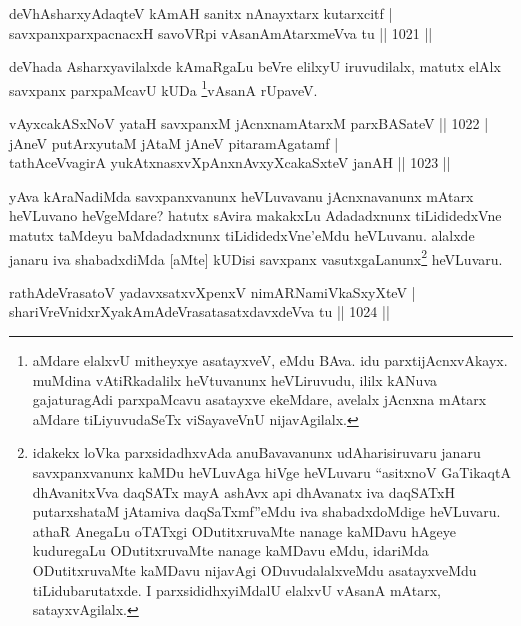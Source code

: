 
\begin{shl}
deVhAsharxyAdaqteV kAmAH sanitx nAnayxtarx kutarxcitf | \\
savxpanxparxpacnacxH savoVR\s pi vAsanAmAtarxmeVva tu \hfill||  1021 ||  
\end{shl}

\begin{artha}
deVhada Asharxyavilalxde kAmaRgaLu beVre elilxyU iruvudilalx, matutx elAlx savxpanx parxpaMcavU kUDa \footnote[1]{aMdare elalxvU mitheyxye asatayxveV, eMdu BAva. idu parxtijAcnxvAkayx. muMdina vAtiRkadalilx heVtuvanunx heVLiruvudu, ililx kANuva gajaturagAdi parxpaMcavu asatayxve ekeMdare, avelalx jAcnxna mAtarx aMdare tiLiyuvudaSeTx viSayaveVnU nijavAgilalx.}vAsanA rUpaveV.
\end{artha}


\begin{shl}
vAyxcakASxNoV yataH savxpanxM jAcnxnamAtarxM parxBASateV \hfill||  1022 | \\
jAneV putArxyutaM jAtaM jAneV pitaramAgatamf | \\
tathAceVvagirA yukAtxnasxvXpAnxnAvxyXcakaSxteV janAH \hfill||  1023 ||  
\end{shl}

\begin{artha}
yAva kAraNadiMda savxpanxvanunx heVLuvavanu jAcnxnavanunx mAtarx heVLuvano heVgeMdare? hatutx sAvira makakxLu Adadadxnunx tiLididedxVne matutx taMdeyu baMdadadxnunx tiLididedxVne'eMdu heVLuvanu. alalxde janaru iva shabadxdiMda [aMte] kUDisi savxpanx vasutxgaLanunx\footnote[2]{idakekx loVka parxsidadhxvAda anuBavavanunx udAharisiruvaru janaru savxpanxvanunx kaMDu heVLuvAga hiVge heVLuvaru ``asitxnoV GaTikaqtA dhAvanitxVva daqSATx mayA ashAvx api dhAvanatx iva daqSATxH putarxshataM jAtamiva daqSaTxmf''eMdu iva shabadxdoMdige heVLuvaru. athaR AnegaLu oTATxgi ODutitxruvaMte nanage kaMDavu hAgeye kuduregaLu ODutitxruvaMte nanage kaMDavu eMdu, idariMda ODutitxruvaMte kaMDavu nijavAgi ODuvudalalxveMdu asatayxveMdu tiLidubarutatxde. I parxsididhxyiMdalU elalxvU vAsanA mAtarx, satayxvAgilalx.} heVLuvaru.
\end{artha}

\begin{shl}
\footnotemark[3]rathAdeVrasatoV yadavxsatxvXpenxV nimARNamiVkaSxyXteV | \\
shariVreVnidxrXyakAmAdeVrasatasatxdavxdeVva tu \hfill||  1024 ||  
\end{shl}

